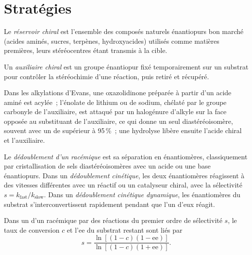 \section{Stratégies}

\begin{definition}\label{def:b3:asymmetric-synthesis:chiral-pool}
Le \emph{réservoir chiral} est l'ensemble des
composés naturels énantiopurs bon marché (acides aminés, sucres,
terpènes, hydroxyacides) utilisés comme matières premières, leurs
stéréocentres étant transmis à la cible.
\end{definition}

\begin{definition}\label{def:b3:asymmetric-synthesis:auxiliary}
Un \emph{auxiliaire chiral} est un groupe
énantiopur fixé temporairement sur un substrat pour contrôler la
stéréochimie d'une réaction, puis retiré et récupéré.
\end{definition}

Dans les alkylations d'Evans, une oxazolidinone préparée à partir d'un
acide aminé est acylée~; l'énolate de lithium ou de sodium, chélaté par le
groupe carbonyle de l'auxiliaire, est attaqué par un halogénure d'alkyle
sur la face opposée au substituant de l'auxiliaire, ce qui donne un seul
diastéréoisomère, souvent avec un de supérieur à 95\,\%~; une hydrolyse libère
ensuite l'acide chiral et l'auxiliaire.

\begin{definition}[Dédoublements]\label{def:b3:asymmetric-synthesis:resolution}
Le \emph{dédoublement d'un racémique} est sa
séparation en énantiomères, classiquement par cristallisation de sels
diastéréoisomères avec un acide ou une base énantiopurs. Dans un \emph{dédoublement cinétique},
les deux énantiomères réagissent à des vitesses différentes avec un réactif
ou un catalyseur chiral, avec la sélectivité $s = k_{\mathrm{fast}}/k_{\mathrm{slow}}$. Dans un \emph{dédoublement cinétique dynamique}, les énantiomères du substrat
s'interconvertissent rapidement pendant que l'un d'eux réagit.
\end{definition}

\begin{theorem}\label{thm:b3:asymmetric-synthesis:kagan}
Dans un  d'un racémique par des réactions du premier ordre de sélectivité $s$,
le taux de conversion $c$ et l'ee du substrat restant sont liés par
\[
  s = \frac{\ln[(1 - c)(1 - \mathrm{ee})]}{\ln[(1 - c)(1 + \mathrm{ee})]}.
\]
\end{theorem}

